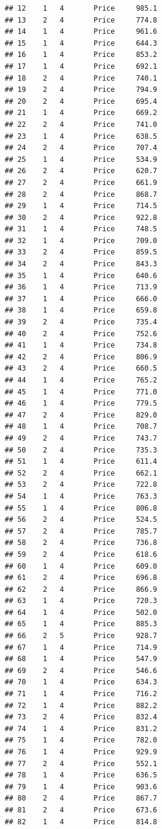 \documentclass[12pt,]{krantz}
\theoremstyle{definition}
\theoremstyle{definition}
\theoremstyle{remark}
\begin{document}
\begin{verbatim}
## 12    1   4       Price     985.1
## 13    2   4       Price     774.8
## 14    1   4       Price     961.6
## 15    1   4       Price     644.3
## 16    1   4       Price     853.2
## 17    1   4       Price     692.1
## 18    2   4       Price     740.1
## 19    2   4       Price     794.9
## 20    2   4       Price     695.4
## 21    1   4       Price     669.2
## 22    2   4       Price     741.0
## 23    1   4       Price     638.5
## 24    2   4       Price     707.4
## 25    1   4       Price     534.9
## 26    2   4       Price     620.7
## 27    2   4       Price     661.9
## 28    2   4       Price     868.7
## 29    1   4       Price     714.5
## 30    2   4       Price     922.8
## 31    1   4       Price     748.5
## 32    1   4       Price     709.0
## 33    2   4       Price     859.5
## 34    2   4       Price     843.3
## 35    1   4       Price     640.6
## 36    1   4       Price     713.9
## 37    1   4       Price     666.0
## 38    1   4       Price     659.8
## 39    2   4       Price     735.4
## 40    2   4       Price     752.6
## 41    1   4       Price     734.8
## 42    2   4       Price     806.9
## 43    2   4       Price     660.5
## 44    1   4       Price     765.2
## 45    1   4       Price     771.0
## 46    1   4       Price     779.5
## 47    2   4       Price     829.0
## 48    1   4       Price     708.7
## 49    2   4       Price     743.7
## 50    2   4       Price     735.3
## 51    1   4       Price     611.4
## 52    2   4       Price     662.1
## 53    2   4       Price     722.8
## 54    1   4       Price     763.3
## 55    1   4       Price     806.8
## 56    2   4       Price     524.5
## 57    2   4       Price     785.7
## 58    2   4       Price     736.8
## 59    2   4       Price     618.6
## 60    1   4       Price     609.0
## 61    2   4       Price     696.8
## 62    2   4       Price     866.9
## 63    1   4       Price     720.3
## 64    1   4       Price     502.0
## 65    1   4       Price     885.3
## 66    2   5       Price     928.7
## 67    1   4       Price     714.9
## 68    1   4       Price     547.9
## 69    2   4       Price     546.6
## 70    1   4       Price     634.3
## 71    1   4       Price     716.2
## 72    1   4       Price     882.2
## 73    2   4       Price     832.4
## 74    1   4       Price     831.2
## 75    1   4       Price     782.0
## 76    1   4       Price     929.9
## 77    2   4       Price     552.1
## 78    1   4       Price     636.5
## 79    1   4       Price     903.6
## 80    2   4       Price     867.7
## 81    2   4       Price     673.6
## 82    1   4       Price     814.8

\end{verbatim}
\end{document}
